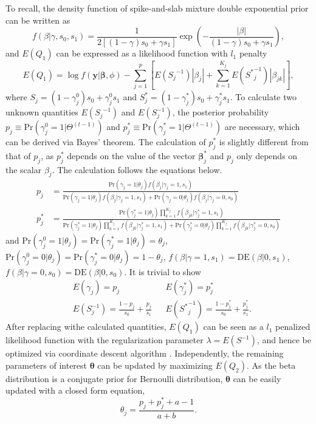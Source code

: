 \documentclass[AMA,STIX1COL,]{WileyNJD-v2}
\begin{document}
To recall, the density function of spike-and-slab mixture double
exponential prior can be written as \[
f(\beta|\gamma, s_0, s_1) = \frac{1}{2\left[(1-\gamma)s_0 + \gamma s_1\right]}\exp(-\frac{|\beta|}{(1-\gamma)s_0 + \gamma s_1}),
\] and \(E(Q_1)\) can be expressed as a likelihood function with \(l_1\)
penalty \begin{equation}\label{eq:Q1_CD}
E(Q_1) = \log f(\textbf{y}|\boldsymbol{\beta}, \phi) - \sum\limits_{j=1}^p\left[E({S_j}^{-1})|\beta_j|+\sum\limits_{k=1}^{K_j}E({S^{*}}^{-1}_{j})|\beta_{jk}|\right],
\end{equation} where
\(S_{j} = (1-\gamma^{0}_{j}) s_0 + \gamma^{0}_{j} s_1\) and
\(S^*_{j} = (1-\gamma^*_{j}) s_0 + \gamma^*_{j} s_1\). To calculate two
unknown quantities \(E({S_j}^{-1})\) and \(E(S^{-1}_j)\), the posterior
probability \(p_{j} \equiv \text{Pr}(\gamma^{0}_{j}=1|\Theta^{(t-1)})\)
and \(p_{j}^*\equiv \text{Pr}(\gamma^*_{j}=1|\Theta^{(t-1)})\) are
necessary, which can be derived via Bayes' theorem. The calculation of
\(p_j^*\) is slightly different from that of \(p_j\), as \(p_j^*\)
depends on the value of the vector \(\boldsymbol{\beta}^*_{j}\) and
\(p_j\) only depends on the scalar \(\beta_j\). The calculation follows
the equations below. \begin{align*}
p_{j} &= \frac{\text{Pr}(\gamma_{j} = 1|\theta_j)f(\beta_{j}|\gamma_{j}=1, s_1) }{\text{Pr}(\gamma_{j} = 1|\theta_j)f(\beta_{j}|\gamma_{j}=1, s_1) + \text{Pr}(\gamma_{j} = 0|\theta_j)f(\beta_{j}|\gamma_{j}=0, s_0)}\\
p^*_{j} &= \frac{\text{Pr}(\gamma^{*}_{j} = 1|\theta_j)\prod\limits_{k=1}^{K_j}f(\beta_{jk}|\gamma^{*}_{j}=1, s_1) }{\text{Pr}(\gamma^{*}_{j} = 1|\theta_j)\prod\limits_{k=1}^{K_j}f(\beta_{jk}|\gamma^{*}_{j}=1, s_1) + \text{Pr}(\gamma^{*}_{j} = 0|\theta_j)\prod\limits_{k=1}^{K_j}f(\beta_{jk}|\gamma^{*}_{j}=0, s_0)}
\end{align*} and
\(\text{Pr}(\gamma_{j}^{0} = 1|\theta_j) = \text{Pr}(\gamma_{j}^*= 1|\theta_j) = \theta_j\),
\(\text{Pr}(\gamma_{j}^{0} = 0|\theta_j) = \text{Pr}(\gamma_{j}^*= 0|\theta_j) = 1-\theta_j\),
\(f(\beta|\gamma=1, s_1) = \text{DE}(\beta|0 , s_1)\),
\(f(\beta|\gamma=0, s_0) = \text{DE}(\beta|0 , s_0)\). It is trivial to
show \begin{align}\label{eq:exp_scale}
&E(\gamma_{j})  = p_{j} & &E(\gamma^{*}_{j}) = p_{j}^{*}\nonumber\\
&E({S}^{-1}_{j}) = \frac{1-p_{j}}{s_0} + \frac{p_{j}}{s_1} & &E({S^*}^{-1}_{j}) = \frac{1-p_{j}^{*}}{s_0} + \frac{p_{j}^{*}}{s_1}.
\end{align} After replacing withe calculated quantities, \(E(Q_1)\) can
be seen as a \(l_1\) penalized likelihood function with the
regularization parameter \(\lambda = E(S^{-1})\), and hence be optimized
via coordinate descent algorithm \citep{Friedman2010}. Independently,
the remaining parameters of interest \(\boldsymbol{\theta}\) can be
updated by maximizing \(E(Q_2)\). As the beta distribution is a
conjugate prior for Bernoulli distribution, \(\boldsymbol{\theta}\) can
be easily updated with a closed form equation,
\begin{equation}\label{eq:update_theta}
\theta_j = \frac{p_j + p^*_{j} + a - 1 }{a + b}.
\end{equation}
\end{document}

